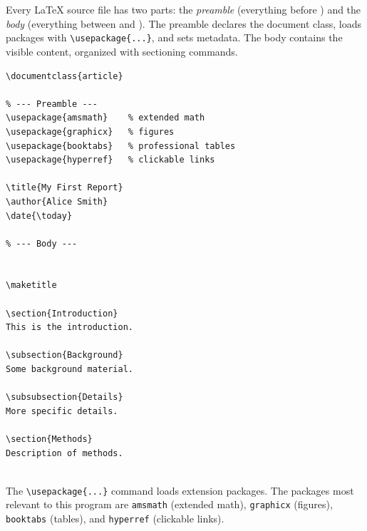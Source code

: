 Every \LaTeX{} source file has two parts: the \emph{preamble}
(everything before \verb||) and the \emph{body}
(everything between \verb|| and
\verb||). The preamble declares the document class,
loads packages with \verb|\usepackage{...}|, and sets metadata. The
body contains the visible content, organized with sectioning commands.

\begin{lstlisting}[style=inlineStyle, caption={Minimal compilable document with preamble and sectioning}]
\documentclass{article}

% --- Preamble ---
\usepackage{amsmath}    % extended math
\usepackage{graphicx}   % figures
\usepackage{booktabs}   % professional tables
\usepackage{hyperref}   % clickable links

\title{My First Report}
\author{Alice Smith}
\date{\today}

% --- Body ---


\maketitle

\section{Introduction}
This is the introduction.

\subsection{Background}
Some background material.

\subsubsection{Details}
More specific details.

\section{Methods}
Description of methods.


\end{lstlisting}

The \verb|\usepackage{...}| command loads extension packages. The
packages most relevant to this program are \texttt{amsmath} (extended
math), \texttt{graphicx} (figures), \texttt{booktabs} (tables), and
\texttt{hyperref} (clickable links). 

